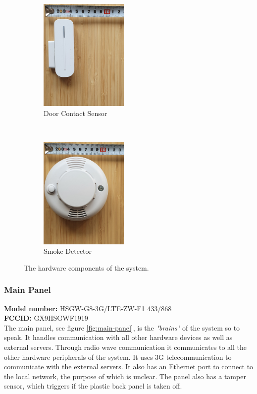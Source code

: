\begin{figure}[!ht]
    \begin{subfigure}[t]{0.33\textwidth}
        \includegraphics[height=2.15in]{images/3-system/door-contact.png}
        \caption{Door Contact Sensor}
        \label{fig:door-contact}
    \end{subfigure}%
    ~
    \begin{subfigure}[t]{0.33\textwidth}
        \includegraphics[height=2.15in]{images/3-system/smoke-detector.png}
        \caption{Smoke Detector}
        \label{fig:smoke-detector}
    \end{subfigure}
    \caption{The hardware components of the system.}
    \label{fig:hardware-components}
\end{figure}
\subsubsection{Main Panel}
\textbf{Model number:} HSGW-G8-3G/LTE-ZW-F1 433/868 \\
\textbf{FCCID:} GX9HSGWF1919 \\
The main panel, see figure \ref{fig:main-panel}, is the \textit{"brains"} of the system so to speak. It handles communication with all other hardware devices as well as external servers. Through radio wave communication it communicates to all the other hardware peripherals of the system. It uses 3G telecommunication to communicate with the external servers. It also has an Ethernet port to connect to the local network, the purpose of which is unclear. The panel also has a tamper sensor, which triggers if the plastic back panel is taken off.

